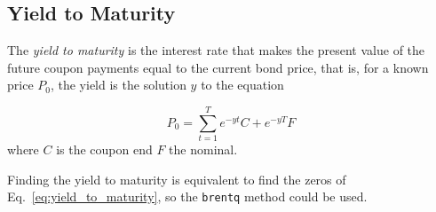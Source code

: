 \subsection{Yield to Maturity}
The \emph{yield to maturity} is the interest rate that makes the present value of the future coupon payments equal to the current bond price, that is, for a known price $P_0$, the yield is the solution $y$ to the equation

\begin{equation}
	P_0 = \sum_{t=1}^T e^{-yt}C + e^{-yT}F 
\label{eq:yield_to_maturity}
\end{equation}
where $C$ is the coupon end $F$ the nominal.

Finding the yield to maturity is equivalent to find the zeros of Eq.~\ref{eq:yield_to_maturity}, so the \texttt{brentq} method could be used.


